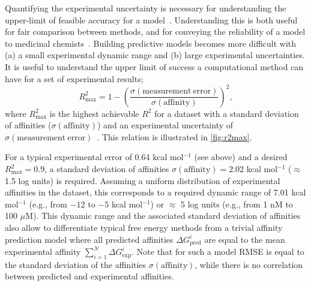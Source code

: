 \documentclass[9pt,bestpractices]{livecoms}
\begin{document}
Quantifying the experimental uncertainty is necessary for understanding the upper-limit of feasible accuracy for a model~\cite{brown2009healthy}. Understanding this is both useful for fair comparison between methods, and for conveying the reliability of a model to medicinal chemists~\cite{griffen2020chemists}. Building predictive models becomes more difficult with (a) a small experimental dynamic range and (b) large experimental uncertainties. It is useful to understand the upper limit of success a computational method can have for a set of experimental results;
%
\begin{equation}\label{eqn:r2max}
    R^2_{\mathrm{max}} = 1 - \left(\frac{\sigma(\mathrm{measurement\   error})}{\sigma({\mathrm{affinity}})}\right) ^2,
\end{equation}
%
where $R^2_{\mathrm{max}}$ is the highest achievable $R^2$ for a dataset with a standard deviation of affinities ($\sigma(\mathrm{affinity})$) and an experimental uncertainty of  $\sigma\mathrm{(measurement\ error)}$~\cite{sheridan2020experimental}. This relation is illustrated in \ref{fig:r2max}.

For a typical experimental error of 0.64 kcal mol$^{-1}$ (see above) and a desired $R^2_{\mathrm{max}} = 0.9$, a standard deviation of affinities $\sigma(\mathrm{affinity}) = 2.02 $ kcal mol$^{-1}$ ($\approx$1.5 log units) is required. Assuming a uniform distribution of experimental affinities in the dataset, this corresponds to a required dynamic range of 7.01 kcal mol$^{-1}$ (e.g., from $-12$ to $-5$ kcal mol$^{-1}$) or $\approx$ 5 log units (e.g., from 1 nM to 100 $\mu$M). This dynamic range and the associated standard deviation of affinities also allow to differentiate typical free energy methods from a trivial affinity prediction model where all predicted affinities $\Delta G_{\text{pred}}^i$ are equal to the mean experimental affinity $\sum_{i=1}^{N} \Delta G_{\text{exp}}^i$. Note that for such a model RMSE is equal to the standard deviation of the affinities $\sigma({\mathrm{affinity}})$, while there is no correlation between predicted and experimental affinities.
\end{document}
